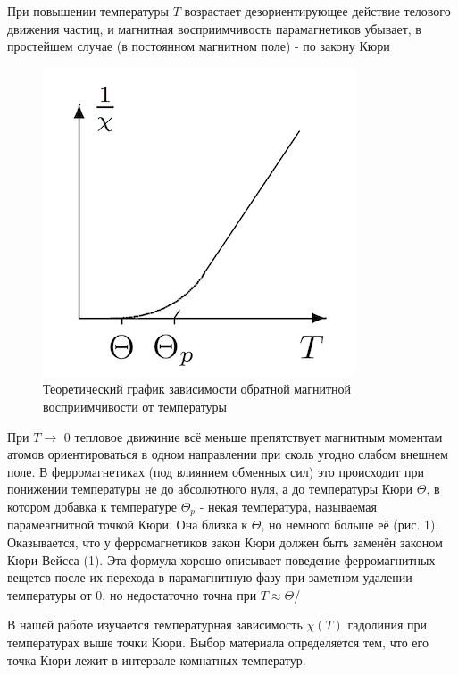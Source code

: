 \documentclass[a4paper, 12pt]{article}%
\begin{document}
При повышении температуры $T$ возрастает дезориентирующее действие телового движения частиц, и магнитная восприимчивость парамагнетиков убывает, в простейшем случае (в постоянном магнитном поле) - по закону Кюри

\begin{figure} 
	\includegraphics{images/Kury_veis.png}
	\caption{Теоретический график зависимости обратной магнитной восприимчивости от температуры}
\end{figure}

При $T \rightarrow$ 0 тепловое движиние всё меньше препятствует магнитным моментам атомов ориентироваться в одном направлении при сколь угодно слабом внешнем поле. В ферромагнетиках (под влиянием обменных сил) это происходит при понижении температуры не до абсолютного нуля, а до температуры Кюри $\Theta$, в котором добавка к температуре $\Theta_p$ - некая температура, называемая парамеагнитной точкой Кюри. Она близка к $\Theta$, но немного больше её (рис. 1). Оказывается, что у ферромагнетиков закон Кюри должен быть заменён законом Кюри-Вейсса (1). Эта формула хорошо описывает поведение ферромагнитных вещетсв после их перехода в парамагнитную фазу при заметном удалении температуры от 0, но недостаточно точна при $T \approx \Theta$/

\vspace{0.5cm}

В нашей работе изучается температурная зависимость $\chi (T)$ гадолиния при температурах выше точки Кюри. Выбор материала определяется тем, что его точка Кюри лежит в интервале комнатных температур.
\end{document}
